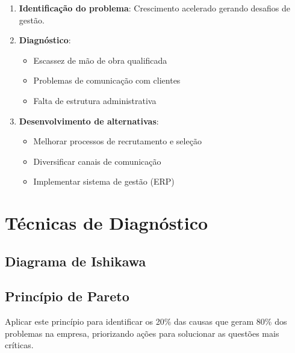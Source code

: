 \documentclass[11pt]{article}
\begin{document}
\begin{enumerate}
    \item \textbf{Identificação do problema}: Crescimento acelerado gerando desafios de gestão.
    \item \textbf{Diagnóstico}:
    \begin{itemize}
        \item Escassez de mão de obra qualificada
        \item Problemas de comunicação com clientes
        \item Falta de estrutura administrativa
    \end{itemize}
    \item \textbf{Desenvolvimento de alternativas}:
    \begin{itemize}
        \item Melhorar processos de recrutamento e seleção
        \item Diversificar canais de comunicação
        \item Implementar sistema de gestão (ERP)
    \end{itemize}
\end{enumerate}

\section{Técnicas de Diagnóstico}

\subsection{Diagrama de Ishikawa}




\subsection{Princípio de Pareto}
Aplicar este princípio para identificar os 20\% das causas que geram 80\% dos problemas na empresa, priorizando ações para solucionar as questões mais críticas.
\end{document}
